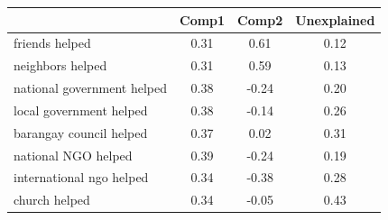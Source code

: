 {
\def\sym#1{\ifmmode^{#1}\else\(^{#1}\)\fi}
\begin{tabular}{l*{1}{ccc}}
\toprule
                    &       Comp1&       Comp2& Unexplained\\
\midrule
friends helped      &        0.31&        0.61&        0.12\\
neighbors helped    &        0.31&        0.59&        0.13\\
national government helped&        0.38&       -0.24&        0.20\\
local government helped&        0.38&       -0.14&        0.26\\
barangay council helped&        0.37&        0.02&        0.31\\
national NGO helped &        0.39&       -0.24&        0.19\\
international ngo helped&        0.34&       -0.38&        0.28\\
church helped       &        0.34&       -0.05&        0.43\\
\bottomrule
\end{tabular}
}
